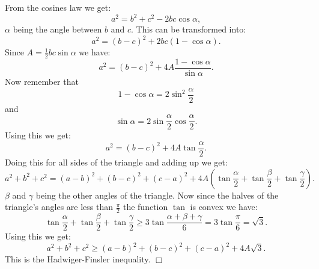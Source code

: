 \documentclass[12pt]{article}
\begin{document}
From the cosines law we get:
$$a^2=b^2+c^2-2bc\cos\alpha,$$
$\alpha$ being the angle between $b$ and $c$. This can be transformed into:
$$a^2=(b-c)^2+2bc(1-\cos\alpha).$$
Since $A=\frac{1}{2}bc\sin\alpha$ we have:
$$a^2=(b-c)^2+4A\frac{1-\cos\alpha}{\sin\alpha}.$$
Now remember that
$$1-\cos\alpha=2\sin^2\frac{\alpha}{2}$$
and
$$\sin\alpha=2\sin\frac{\alpha}{2}\cos\frac{\alpha}{2}.$$
Using this we get:
$$a^2=(b-c)^2+4A\tan\frac{\alpha}{2}.$$
Doing this for all sides of the triangle and adding up we get:
$$a^2+b^2+c^2=(a-b)^2+(b-c)^2+(c-a)^2+4A\left(\tan\frac{\alpha}{2} +\tan\frac{\beta}{2}+\tan\frac{\gamma}{2}\right).$$
$\beta$ and $\gamma$ being the other angles of the triangle. Now since the halves of the triangle's angles are less than $\frac{\pi}{2}$ the function $\tan$ is convex we have:
$$\tan\frac{\alpha}{2}+\tan\frac{\beta}{2}+\tan\frac{\gamma}{2} \geq 3\tan\frac{\alpha+\beta+\gamma}{6} =3\tan\frac{\pi}{6}=\sqrt{3}.$$
Using this we get:
$$a^2+b^2+c^2\geq (a-b)^2+(b-c)^2+(c-a)^2+4A\sqrt{3}.$$
This is the Hadwiger-Finsler inequality. $\Box$
\end{document}
